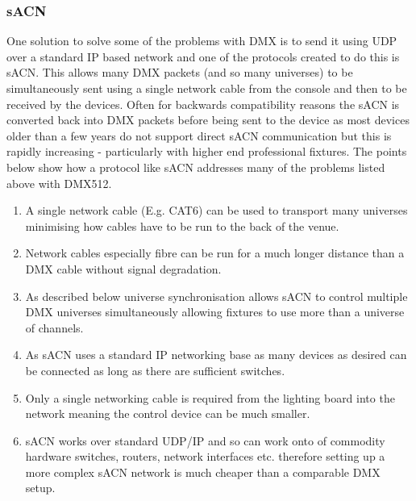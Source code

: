 \documentclass[11pt,a4paper]{article}
\begin{document}
\subsubsection{sACN}
One solution to solve some of the problems with DMX is to send it using UDP over a standard IP based network and one of the protocols created to do this is sACN. This allows many DMX packets (and so many universes) to be simultaneously sent using a single network cable from the console and then to be received by the devices. Often for backwards compatibility reasons the sACN is converted back into DMX packets before being sent to the device as most devices older than a few years do not support direct sACN communication but this is rapidly increasing - particularly with higher end professional fixtures. The points below show how a protocol like sACN addresses many of the problems listed above with DMX512.

\begin{enumerate}{}
	\item A single network cable (E.g. CAT6) can be used to transport many universes minimising how cables have to be run to the back of the venue.
	\item Network cables especially fibre can be run for a much longer distance than a DMX cable without signal degradation.
	\item As described below universe synchronisation allows sACN to control multiple DMX universes simultaneously allowing fixtures to use more than a universe of channels.
	\item As sACN uses a standard IP networking base as many devices as desired can be connected as long as there are sufficient switches.
	\item Only a single networking cable is required from the lighting board into the network meaning the control device can be much smaller.
	\item sACN works over standard UDP/IP and so can work onto of commodity hardware switches, routers, network interfaces etc. therefore setting up a more complex sACN network is much cheaper than a comparable DMX setup.
\end{enumerate}
\end{document}
